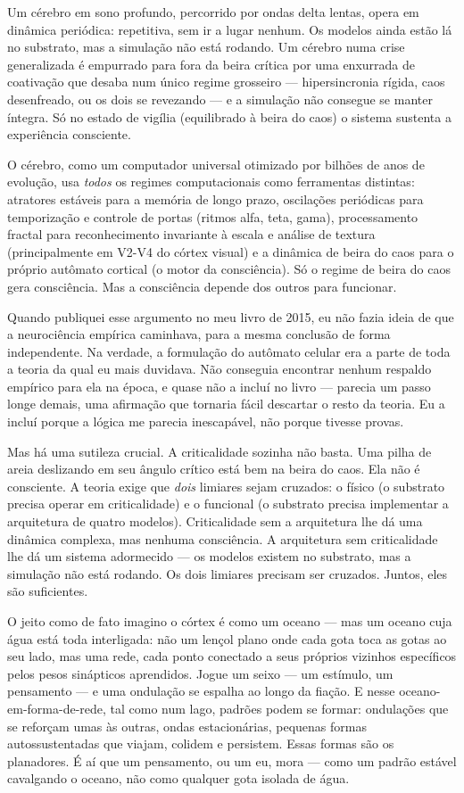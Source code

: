 \documentclass[11pt, twoside, openright]{book}
\begin{document}
Um cérebro em sono profundo, percorrido por ondas delta lentas, opera em dinâmica periódica: repetitiva, sem ir a lugar nenhum. Os modelos ainda estão lá no substrato, mas a simulação não está rodando. Um cérebro numa crise generalizada é empurrado para fora da beira crítica por uma enxurrada de coativação que desaba num único regime grosseiro --- hipersincronia rígida, caos desenfreado, ou os dois se revezando --- e a simulação não consegue se manter íntegra. Só no estado de vigília (equilibrado à beira do caos) o sistema sustenta a experiência consciente.

O cérebro, como um computador universal otimizado por bilhões de anos de evolução, usa \textit{todos} os regimes computacionais como ferramentas distintas: atratores estáveis para a memória de longo prazo, oscilações periódicas para temporização e controle de portas (ritmos alfa, teta, gama), processamento fractal para reconhecimento invariante à escala e análise de textura (principalmente em V2-V4 do córtex visual) e a dinâmica de beira do caos para o próprio autômato cortical (o motor da consciência). Só o regime de beira do caos gera consciência. Mas a consciência depende dos outros para funcionar.

Quando publiquei esse argumento no meu livro de 2015, eu não fazia ideia de que a neurociência empírica caminhava, para a mesma conclusão de forma independente. Na verdade, a formulação do autômato celular era a parte de toda a teoria da qual eu mais duvidava. Não conseguia encontrar nenhum respaldo empírico para ela na época, e quase não a incluí no livro --- parecia um passo longe demais, uma afirmação que tornaria fácil descartar o resto da teoria. Eu a incluí porque a lógica me parecia inescapável, não porque tivesse provas.

Mas há uma sutileza crucial. A criticalidade sozinha não basta. Uma pilha de areia deslizando em seu ângulo crítico está bem na beira do caos. Ela não é consciente. A teoria exige que \textit{dois} limiares sejam cruzados: o físico (o substrato precisa operar em criticalidade) e o funcional (o substrato precisa implementar a arquitetura de quatro modelos). Criticalidade sem a arquitetura lhe dá uma dinâmica complexa, mas nenhuma consciência. A arquitetura sem criticalidade lhe dá um sistema adormecido --- os modelos existem no substrato, mas a simulação não está rodando. Os dois limiares precisam ser cruzados. Juntos, eles são suficientes.

O jeito como de fato imagino o córtex é como um oceano --- mas um oceano cuja água está toda interligada: não um lençol plano onde cada gota toca as gotas ao seu lado, mas uma rede, cada ponto conectado a seus próprios vizinhos específicos pelos pesos sinápticos aprendidos. Jogue um seixo --- um estímulo, um pensamento --- e uma ondulação se espalha ao longo da fiação. E nesse oceano-em-forma-de-rede, tal como num lago, padrões podem se formar: ondulações que se reforçam umas às outras, ondas estacionárias, pequenas formas autossustentadas que viajam, colidem e persistem. Essas formas são os planadores. É aí que um pensamento, ou um eu, mora --- como um padrão estável cavalgando o oceano, não como qualquer gota isolada de água.
\end{document}
